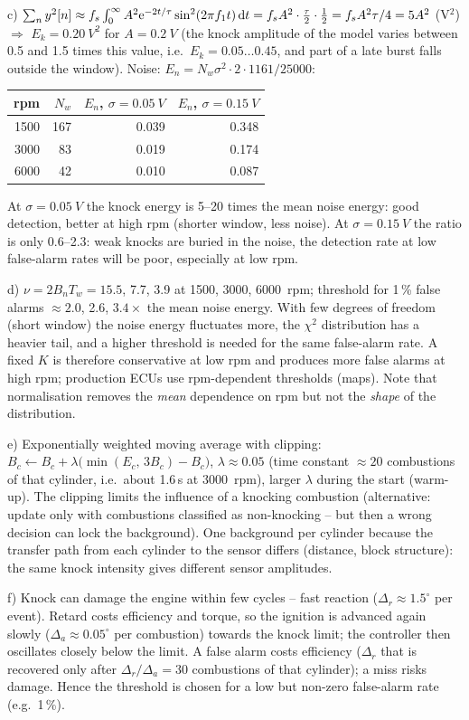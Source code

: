 \begin{solution}
c) $\sum_n y^2[n]\approx f_s\int_0^\infty A^2\mathrm{e}^{-2t/\tau}\sin^2(2\pi f_1t)\,\mathrm{d} t
=f_sA^2\cdot\tfrac{\tau}{2}\cdot\tfrac12=f_sA^2\tau/4=5A^2$ (V$^2$) $\Rightarrow$
$E_k=\SI{0.20}{V^2}$ for $A=\SI{0.2}{V}$ (the knock amplitude of the model varies
between 0.5 and 1.5 times this value, i.e.\ $E_k=0.05\dots0.45$, and part of a late
burst falls outside the window). Noise: $E_n=N_w\sigma^2\cdot2\cdot1161/25000$:
\begin{center}
\small
\begin{tabular}{@{}rrrr@{}}
\toprule
rpm & $N_w$ & $E_n$, $\sigma=\SI{0.05}{V}$ & $E_n$, $\sigma=\SI{0.15}{V}$\\
\midrule
1500 & 167 & 0.039 & 0.348\\
3000 & 83 & 0.019 & 0.174\\
6000 & 42 & 0.010 & 0.087\\
\bottomrule
\end{tabular}
\end{center}
At $\sigma=\SI{0.05}{V}$ the knock energy is 5--20 times the mean noise energy: good
detection, better at high rpm (shorter window, less noise). At $\sigma=\SI{0.15}{V}$
the ratio is only 0.6--2.3: weak knocks are buried in the noise, the detection rate at
low false-alarm rates will be poor, especially at low rpm.

d) $\nu=2B_nT_w=15.5$, 7.7, 3.9 at 1500, 3000, \SI{6000}{rpm}; threshold for 1\,\% false
alarms $\approx2.0$, 2.6, $3.4\times$ the mean noise energy. With few degrees of freedom
(short window) the noise energy fluctuates more, the $\chi^2$ distribution has a heavier
tail, and a higher threshold is needed for the same false-alarm rate. A fixed $K$ is
therefore conservative at low rpm and produces more false alarms at high rpm; production
ECUs use rpm-dependent thresholds (maps). Note that normalisation removes the
\emph{mean} dependence on rpm but not the \emph{shape} of the distribution.

e) Exponentially weighted moving average with clipping:
$B_c\leftarrow B_c+\lambda\bigl(\min(E_c,\,3B_c)-B_c\bigr)$, $\lambda\approx0.05$ (time
constant $\approx20$ combustions of that cylinder, i.e.\ about 1.6\,s at
\SI{3000}{rpm}), larger $\lambda$ during the start (warm-up). The clipping limits the
influence of a knocking combustion (alternative: update only with combustions classified
as non-knocking -- but then a wrong decision can lock the background). One background per
cylinder because the transfer path from each cylinder to the sensor differs (distance,
block structure): the same knock intensity gives different sensor amplitudes.

f) Knock can damage the engine within few cycles -- fast reaction ($\Delta_r\approx
1.5^\circ$ per event). Retard costs efficiency and torque, so the ignition is advanced
again slowly ($\Delta_a\approx0.05^\circ$ per combustion) towards the knock limit; the
controller then oscillates closely below the limit. A false alarm costs efficiency
($\Delta_r$ that is recovered only after $\Delta_r/\Delta_a=30$ combustions of that
cylinder); a miss risks damage. Hence the threshold is chosen for a low but non-zero
false-alarm rate (e.g.\ 1\,\%).
\end{solution}

